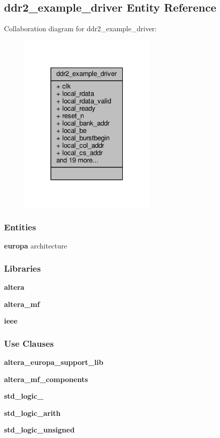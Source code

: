\subsection{ddr2\+\_\+example\+\_\+driver Entity Reference}
\label{classddr2__example__driver}


Collaboration diagram for ddr2\+\_\+example\+\_\+driver\+:\nopagebreak
\begin{figure}[H]
\begin{center}
\leavevmode
\includegraphics[width=187pt]{d9/d90/classddr2__example__driver__coll__graph}
\end{center}
\end{figure}
\subsubsection*{Entities}
\begin{DoxyCompactItemize}
\item 
{\bf europa} architecture
\end{DoxyCompactItemize}
\subsubsection*{Libraries}
 \begin{DoxyCompactItemize}
\item 
{\bf altera} 
\item 
{\bf altera\+\_\+mf} 
\item 
{\bf ieee} 
\end{DoxyCompactItemize}
\subsubsection*{Use Clauses}
 \begin{DoxyCompactItemize}
\item 
{\bf altera\+\_\+europa\+\_\+support\+\_\+lib}   
\item 
{\bf altera\+\_\+mf\+\_\+components}   
\item 
{\bf std\+\_\+logic\+\_}   
\item 
{\bf std\+\_\+logic\+\_\+arith}   
\item 
{\bf std\+\_\+logic\+\_\+unsigned}   
\end{DoxyCompactItemize}
